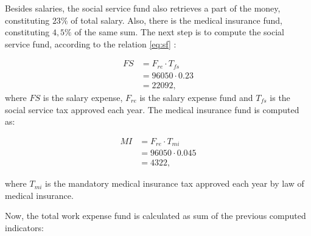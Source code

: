 \begin{table}[H]
\centering
\caption{Salary expenses}
\label{table:salaries}
\end{table}

Besides salaries, the social service fund also retrieves a part of the money, constituting $23\%$ of total  salary. Also, there is the medical insurance fund, constituting $4,5\%$ of the same sum. The next step is to compute the social service fund, according to the relation \eqref{eq:sf} :

\begin{equation}
\label{eq:sf}
\begin{split}
 FS &= F_{re} \cdot T_{fs} \\
    &= 96050 \cdot 0.23  \\
    &= 22092,
\end{split}
\end{equation}
\noindent
where $FS$ is the salary expense, $F_{re}$ is the salary expense fund and $T_{fs}$ is the social service tax approved each year. The medical insurance fund is computed as:

\begin{equation}
\begin{split}
 MI &= F_{re} \cdot T_{mi}\\ 
    &= 96050 \cdot 0.045\\ 
    &= 4322,
 \end{split}
\end{equation}

\noindent
where $T_{mi}$ is the mandatory medical insurance tax approved each year by law of medical insurance.

Now, the total work expense fund is calculated as sum of the previous computed indicators:

